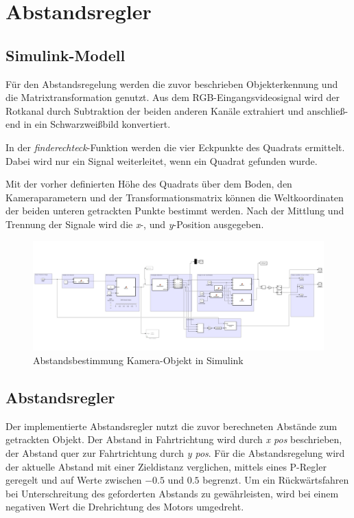 \section{Abstandsregler}
\subsection{Simulink-Modell}
Für den Abstandsregelung werden die zuvor beschrieben Objekterkennung und die Matrixtransformation genutzt. 
Aus dem RGB-Eingangsvideosignal wird der Rotkanal durch Subtraktion der beiden anderen Kanäle extrahiert und anschlie{\ss}- end in ein Schwarzwei{\ss}bild konvertiert.
 
In der \textit{finderechteck}-Funktion werden die vier Eckpunkte des Quadrats ermittelt. Dabei wird nur ein Signal weiterleitet, wenn ein Quadrat gefunden wurde. 

Mit der vorher definierten Höhe des Quadrats über dem Boden,   den Kameraparametern und der Transformationsmatrix können die Weltkoordinaten der beiden unteren getrackten Punkte bestimmt werden. Nach der Mittlung und Trennung der Signale wird die \textit{x}-, und \textit{y}-Position ausgegeben. 



\begin{figure}[h]
	\centering
	\includegraphics[width=1.1\textwidth]{Simulink.PNG}
	\caption{Abstandsbestimmung Kamera-Objekt in Simulink} 
	\label{img:grafik-dummy}
\end{figure}

\subsection{Abstandsregler}
Der implementierte Abstandsregler nutzt die zuvor berechneten Abstände zum getrackten Objekt. Der Abstand in Fahrtrichtung wird durch \textit{x pos} beschrieben, der Abstand quer zur Fahrtrichtung durch \textit{y pos}. 
Für die Abstandsregelung wird der aktuelle Abstand mit einer Zieldistanz verglichen,  mittels eines P-Regler geregelt und auf Werte zwischen $-0.5$ und $0.5$ begrenzt. 
Um ein Rückwärtsfahren bei Unterschreitung des geforderten Abstands zu gewährleisten, wird bei einem negativen Wert die Drehrichtung des Motors umgedreht. \\

